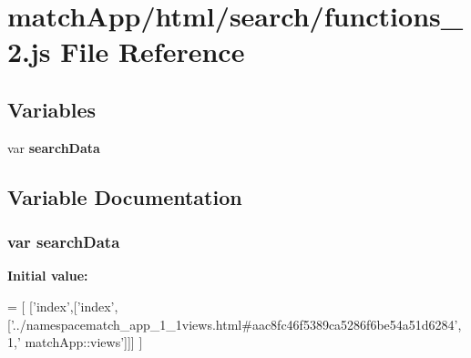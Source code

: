 \section{match\+App/html/search/functions\+\_\+2.js File Reference}
\label{functions__2_8js}
\subsection*{Variables}
\begin{DoxyCompactItemize}
\item 
var {\bf search\+Data}
\end{DoxyCompactItemize}


\subsection{Variable Documentation}
\subsubsection[{search\+Data}]{\setlength{\rightskip}{0pt plus 5cm}var search\+Data}\label{functions__2_8js_ad01a7523f103d6242ef9b0451861231e}
{\bfseries Initial value\+:}
\begin{DoxyCode}
=
[
  [\textcolor{stringliteral}{'index'},[\textcolor{stringliteral}{'index'},[\textcolor{stringliteral}{'../namespacematch\_app\_1\_1views.html#aac8fc46f5389ca5286f6be54a51d6284'},1,\textcolor{stringliteral}{'
      matchApp::views'}]]]
]
\end{DoxyCode}
